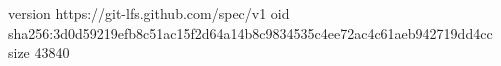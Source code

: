 version https://git-lfs.github.com/spec/v1
oid sha256:3d0d59219efb8c51ac15f2d64a14b8c9834535c4ee72ac4c61aeb942719dd4cc
size 43840
